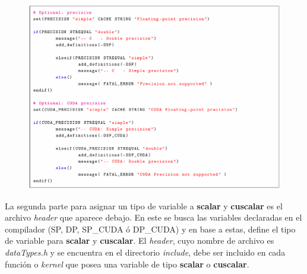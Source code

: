 \newpage

\begin{figure}[H]
	\centering
	\includegraphics[width=\textwidth]{figs/cap3/cmake_2.png}
\end{figure}

La segunda parte para asignar un tipo de variable a \textbf{scalar} y \textbf{cuscalar} es el archivo \textit{header} que aparece debajo. En este se busca las variables declaradas en el compilador (SP, DP, SP\_CUDA ó DP\_CUDA) y en base a estas, define el tipo de variable para \textbf{scalar} y \textbf{cuscalar}. El \textit{header}, cuyo nombre de archivo es \textit{dataTypes.h} y se encuentra en el directorio \textit{include}, debe ser incluido en cada función o \textit{kernel} que posea una variable de tipo  \textbf{scalar} o \textbf{cuscalar}.

